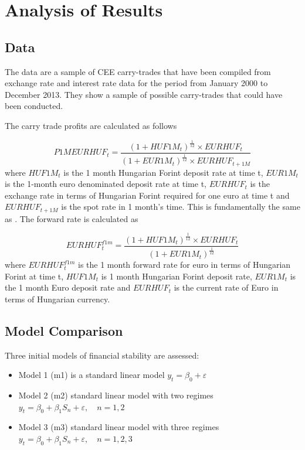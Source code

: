 \documentclass[12pt, a4paper, oneside]{article} %
\begin{document}
\section{Analysis of Results}
\subsection{Data}
The data are a sample of CEE carry-trades that have been compiled from exchange rate and interest rate data for the period from January 2000 to December 2013.  They show a sample of possible carry-trades that could have been conducted. 

The carry trade profits are calculated as follows

\begin{equation}\label{eqref:carryprofit}
P1MEURHUF_t = \frac{(1 + HUF1M_t)^{\frac{1}{12}} \times EURHUF_t }{(1 + EUR1M_t)^{\frac{1}{12}} \times EURHUF_{t+1M}}
\end{equation}
where $HUF1M_t$ is the 1 month Hungarian Forint deposit rate at time t, $EUR1M_t$ is the 1-month euro denominated deposit rate at time t, $EURHUF_t$ is the exchange rate in terms of  Hungarian Forint required for one euro at time t and  $EURHUF_{t+1M}$ is the spot rate in 1 month's time.  This is fundamentally the same as \citep{BrunnermeierCarry}. The forward rate is calculated as

\begin{equation}\label{eqref:forward}
EURHUF_t^{f1m} = \frac{(1 + HUF1M_t)^{\frac{1}{12}} \times EURHUF_t }{(1 + EUR1M_t)^{\frac{1}{12}}}
\end{equation}
where  $EURHUF_t^{f1m}$ is the 1 month forward rate for euro in terms of Hungarian Forint at time t, $HUF1M_t$ is 1 month Hungarian Forint deposit rate, $EUR1M_t$ is the 1 month Euro deposit rate and $EURHUF_t$ is the current rate of Euro in terms of Hungarian currency.  

\subsection{Model Comparison}
Three initial models of financial stability are assessed: 
\begin{itemize}
\item Model 1 (m1) is a standard linear model $y_t = \beta_0  + \varepsilon$
\item Model 2 (m2) standard linear model with two regimes $y_t = \beta_0 + \beta_1 S_n + \varepsilon, \quad n = 1, 2$
\item Model 3 (m3) standard linear model with three regimes $y_t = \beta_0 + \beta_1 S_n + \varepsilon, \quad n = 1, 2, 3$
\end{itemize}
\end{document}
